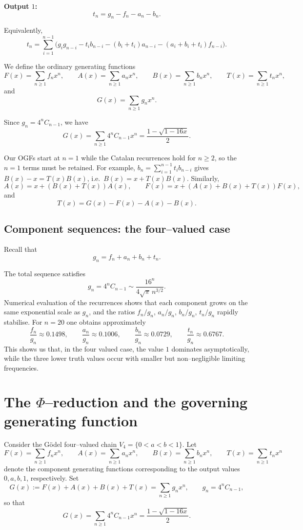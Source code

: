 \documentclass[11pt]{article}
\begin{document}
\noindent\textbf{Output $1$:}
\[
t_n=g_n-f_n-a_n-b_n.
\]

Equivalently,
\[
t_n=\sum_{i=1}^{n-1}\Big(
g_i g_{n-i}
-
t_i b_{n-i}
-
(b_i+t_i)a_{n-i}
-
(a_i+b_i+t_i)f_{n-i}
\Big).
\]

\medskip

We define the ordinary generating functions
\[
F(x)=\sum_{n\ge1} f_n x^n,\qquad
A(x)=\sum_{n\ge1} a_n x^n,\qquad
B(x)=\sum_{n\ge1} b_n x^n,\qquad
T(x)=\sum_{n\ge1} t_n x^n,
\]
and
\[
G(x)=\sum_{n\ge1} g_n x^n.
\]

Since $g_n=4^n C_{n-1}$, we have
\[
G(x)=\sum_{n\ge 1}4^n C_{n-1}x^n=\frac{1-\sqrt{1-16x}}{2}.
\]

Our OGFs start at $n=1$ while the Catalan recurrences hold for $n\ge 2$, so the $n=1$
terms must be retained. For example,
$b_n=\sum_{i=1}^{n-1} t_i b_{n-i}$ gives $B(x)-x=T(x)B(x)$, i.e.\ $B(x)=x+T(x)B(x)$.
Similarly,
\[
A(x)=x+(B(x)+T(x))A(x),\qquad
F(x)=x+(A(x)+B(x)+T(x))F(x),
\]
and
\[
T(x)=G(x)-F(x)-A(x)-B(x).
\]


\subsection{Component sequences: the four--valued case}
Recall that
\[
g_n=f_n+a_n+b_n+t_n.
\]

The total sequence satisfies
\[
g_n=4^n C_{n-1}\sim \frac{16^n}{4\sqrt{\pi}\,n^{3/2}}.
\]
Numerical evaluation of the recurrences shows that each component grows on the
same exponential scale as \(g_n\), and the ratios \(f_n/g_n\), \(a_n/g_n\), \(b_n/g_n\),
\(t_n/g_n\) rapidly stabilise. For \(n=20\) one obtains approximately
\[
\frac{f_n}{g_n}\approx 0.1498,\qquad
\frac{a_n}{g_n}\approx 0.1006,\qquad
\frac{b_n}{g_n}\approx 0.0729,\qquad
\frac{t_n}{g_n}\approx 0.6767.
\]
This shows us that, in the four valued case, the value \(1\) dominates asymptotically,
while the three lower truth values occur with smaller but non--negligible limiting
frequencies.


\section{The $\Phi$--reduction and the governing generating function}

Consider the Gödel four--valued chain \(V_4=\{0<a<b<1\}\). Let
\[
F(x)=\sum_{n\ge1} f_n x^n,\qquad
A(x)=\sum_{n\ge1} a_n x^n,\qquad
B(x)=\sum_{n\ge1} b_n x^n,\qquad
T(x)=\sum_{n\ge1} t_n x^n
\]
denote the component generating functions corresponding to the output values
\(0,a,b,1\), respectively. Set
\[
G(x):=F(x)+A(x)+B(x)+T(x)
=\sum_{n\ge1} g_n x^n,
\qquad
g_n=4^n C_{n-1},
\]
so that
\begin{equation}\label{eq:G-closed}
G(x)=\sum_{n\ge1}4^nC_{n-1}x^n=\frac{1-\sqrt{1-16x}}{2}.
\end{equation}
\end{document}
